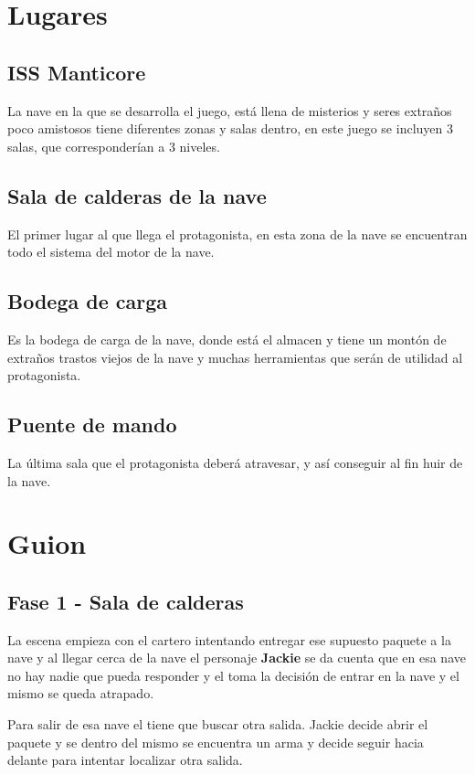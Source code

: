 \section{Lugares}
\subsection{ISS Manticore}
La nave en la que se desarrolla el juego, está llena de misterios y seres extraños poco amistosos
tiene diferentes zonas y salas dentro,
en este juego se incluyen 3 salas, que corresponderían a 3 niveles.

\subsection{Sala de calderas de la nave}
El primer lugar al que llega el protagonista, en esta zona de la nave se encuentran todo el sistema del motor de la nave.

\subsection{Bodega de carga}
Es la bodega de carga de la nave, donde está el almacen y tiene un montón de extraños trastos viejos de la nave y muchas herramientas que serán de utilidad al protagonista.

\subsection{Puente de mando}
La última sala que el protagonista deberá atravesar, y así conseguir al fin huir de la nave.

\section{Guion}
\subsection{Fase 1 - Sala de calderas}
La escena empieza con el cartero intentando entregar ese supuesto paquete a la nave y al llegar cerca de la nave el personaje \textbf{Jackie} se da cuenta que en esa nave no hay nadie que pueda responder y el toma la decisión de entrar en la nave y el mismo se queda atrapado. 

Para salir de esa nave el tiene que buscar otra salida. Jackie decide abrir el paquete y se dentro del mismo se encuentra un arma y decide seguir hacia delante para intentar localizar otra salida.

